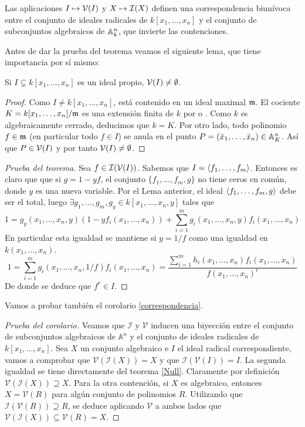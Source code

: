 \documentclass[ACGA.tex]{subfiles}
\begin{document}
\begin{coro}\label{correspondencia} Las aplicaciones $I\mapsto \mathcal{V}(I)$ y $X\mapsto \mathcal{I}(X)$ definen una correspondencia biunívoca entre el conjunto de ideales radicales de $k[x_1,\ldots,x_n]$ y el conjunto de subconjuntos algebraicos de $\mathbb{A}^n_k$, que invierte las contenciones. 
 \end{coro}

Antes de dar la prueba del teorema veamos el siguiente lema, que tiene importancia por sí mismo:

\begin{lemma}
 Si $I\subsetneq k[x_1,\ldots,x_n]$ es un ideal propio, $\mathcal{V}(I)\neq\emptyset$.
\end{lemma}

\begin{proof}
 Como $I\neq k[x_1,\ldots,x_n]$, está contenido en un ideal maximal ${\mathfrak{m}}$. El cociente $K=k[x_1,\ldots,x_n]/{\mathfrak{m}}$ es una extensión finita de $k$ por \cite[Teorema 4.10]{reid} o \cite[Corolario 5.24]{am}. Como $k$ es algebraicamente cerrado, deducimos que $k=K$. Por otro lado, todo polinomio $f\in{\mathfrak{m}}$ (en particular todo $f\in I$) se anula en el punto $P=(\bar{x}_1,\ldots,\bar{x}_n)\in\mathbb{A}^n_K$. Así que $P\in\mathcal{V}(I)$ y por tanto $\mathcal{V}(I)\neq \emptyset$.
\end{proof}

\begin{proof}[Prueba del teorema] Sea $f\in\mathcal{I}(\mathcal{V}(I))$. Sabemos que $I=\langle{f_1,\dotsc,f_m}\rangle$. Entonces es claro que que si $g=1-yf$, el conjunto $\{f_1,\dotsc,f_m,g\}$ no tiene ceros en común, donde $y$ es una nueva variable. Por el Lema anterior, el ideal $\langle{f_1,\dotsc,f_m,g}\rangle$ debe ser el total, luego $\exists g_1,\dotsc,g_m,g_y \in k[x_1,\dotsc,x_n,y]$ tales que
$$
1 = g_y(x_1,\dotsc,x_n,y) (1-yf_i(x_1,\dotsc,x_n)) + \sum_{i=1}^m g_i(x_1,\dotsc,x_n,y) f_i(x_1,\dotsc,x_n)
$$
En particular esta igualdad se mantiene si $y=1/f$ como una igualdad en $k(x_1,\dotsc,x_n)$. 
$$
1 = \sum_{i=1}^m g_i(x_1,\dotsc,x_n,1/f) f_i(x_1,\dotsc,x_n) = \frac{\sum_{i=1}^m h_i(x_1,\dotsc,x_n)f_i(x_1,\dotsc,x_n)}{f(x_1,\dotsc,x_n)^r}
$$
De donde se deduce que $f^r\in I$.
\end{proof}

Vamos a probar también el corolario \ref{correspondencia}.
\begin{proof}[Prueba del corolario]
Veamos que $\mathcal{I}$ y $\mathcal{V}$ inducen una biyección entre el conjunto de subconjuntos algebraicos de $\mathbb{A}^n$ y el conjunto de ideales radicales de $k[x_1,\dots,x_n]$. Sea $X$ un conjunto algebraico e $I$ el ideal radical correspondiente, vamos a comprobar que $\mathcal{V}(\mathcal{I}(X))=X$ y que $\mathcal{I}(\mathcal{V}(I))=I $. La segunda igualdad se tiene directamente del teorema \ref{Null}.  Claramente por definición $\mathcal{V}(\mathcal{I}(X))\supseteq X$. Para la otra contención, si $X$ es algebraico, entonces $X=\mathcal{V}(R)$ para algún conjunto de polinomios $R$. Utilizando que $\mathcal{I}(\mathcal{V}(R))\supseteq R$, se deduce aplicando $\mathcal{V}$ a ambos lados que $\mathcal{V}(\mathcal{I}(X))\subseteq \mathcal{V}(R)=X$.


\end{proof}
\end{document}
